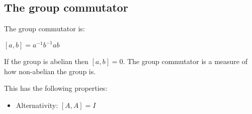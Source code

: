 
\subsection{The group commutator}

The group commutator is:

\([a,b]=a^{-1}b^{-1}ab\)

If the group is abelian then \([a,b]=0\). The group commutator is a measure of how non-abelian the group is.

This has the following properties:

\begin{itemize}
\item Alternativity: \([A,A]=I\)
\end{itemize}

